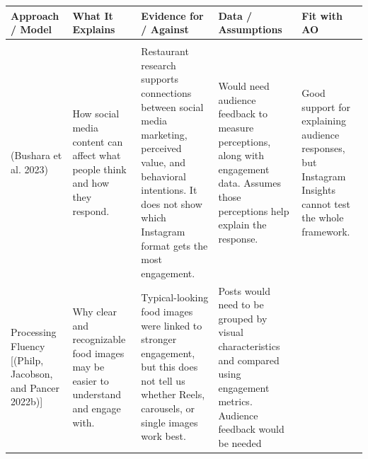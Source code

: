 \documentclass[
  12pt,
  letterpaper,
  DIV=11,
  numbers=noendperiod]{scrartcl}
\begin{document}
\begin{longtable}[]{@{}
  >{\raggedright\arraybackslash}p{}
  >{\raggedright\arraybackslash}p{}
  >{\raggedright\arraybackslash}p{}
  >{\raggedright\arraybackslash}p{}
  >{\raggedright\arraybackslash}p{}@{}}
\toprule\noalign{}
\begin{minipage}[b]{\linewidth}\raggedright
Approach / Model
\end{minipage} & \begin{minipage}[b]{\linewidth}\raggedright
What It Explains
\end{minipage} & \begin{minipage}[b]{\linewidth}\raggedright
Evidence for / Against
\end{minipage} & \begin{minipage}[b]{\linewidth}\raggedright
Data / Assumptions
\end{minipage} & \begin{minipage}[b]{\linewidth}\raggedright
Fit with AO
\end{minipage} \\
\midrule\noalign{}
\endhead
\bottomrule\noalign{}
\endlastfoot
\begin{minipage}[t]{\linewidth}\raggedright
Stimulus--Organism--Response (S--O--R) Framework\\
(Bushara et al. 2023)\strut
\end{minipage} & How social media content can affect what people think
and how they respond. & Restaurant research supports connections between
social media marketing, perceived value, and behavioral intentions. It
does not show which Instagram format gets the most engagement. & Would
need audience feedback to measure perceptions, along with engagement
data. Assumes those perceptions help explain the response. & Good
support for explaining audience responses, but Instagram Insights cannot
test the whole framework. \\
Processing Fluency {[}(Philp, Jacobson, and Pancer 2022b){]} & Why clear
and recognizable food images may be easier to understand and engage
with. & Typical-looking food images were linked to stronger engagement,
but this does not tell us whether Reels, carousels, or single images
work best. & Posts would need to be grouped by visual characteristics
and compared using engagement metrics. Audience feedback would be needed

\end{longtable}
\end{document}
